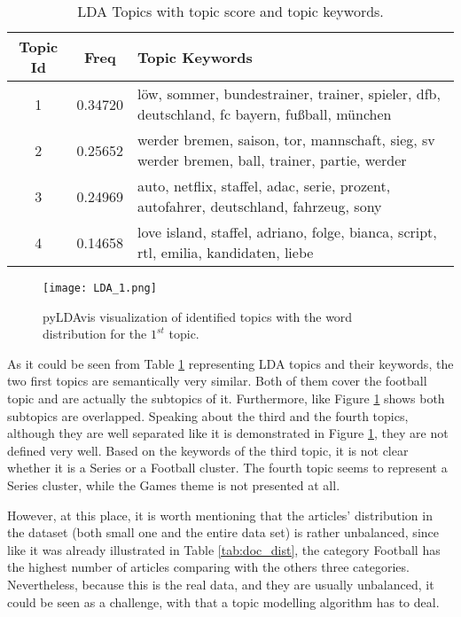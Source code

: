 \documentclass[fontsize=12pt,a4paper,twoside,openany]{scrbook}
\begin{document}
\renewcommand{\arraystretch}{2}
\begin{table}[ht]
    \centering
    \begin{tabularx}{\textwidth}{ |c|c|X| } 
        \hline
        \textbf{Topic Id} & \textbf{Freq} & \textbf{Topic Keywords} \\
        \hline
        1 & 0.34720 &  löw, sommer, bundestrainer, trainer, spieler, dfb, deutschland, fc bayern, fußball, münchen \\
        \hline
        2 & 0.25652 & werder bremen, saison, tor, mannschaft, sieg, sv werder bremen, ball, trainer, partie, werder \\
        \hline
        3 & 0.24969 & auto, netflix, staffel, adac, serie, prozent, autofahrer, deutschland, fahrzeug, sony \\
        \hline
        4 & 0.14658 &  love island, staffel, adriano, folge, bianca, script, rtl, emilia, kandidaten, liebe \\
        \hline
    \end{tabularx}
    \caption{LDA Topics with topic score and topic keywords.}
    \label{tab:lda_topic_keywords}
\end{table}
\renewcommand{\arraystretch}{1}

\begin{figure}[h]
\centering
\texttt{[image: LDA\_1.png]}
\caption{pyLDAvis visualization of identified topics with the word distribution for the \(1^{st}\) topic.}
\label{fig:lda_topics}
\end{figure}


As it could be seen from Table \ref{tab:lda_topic_keywords} representing LDA topics and their keywords, the two first topics are semantically very similar. Both of them cover the football topic and are actually the subtopics of it. Furthermore, like Figure \ref{fig:lda_topics} shows both subtopics are overlapped. Speaking about the third and the fourth topics, although they are well separated like it is demonstrated in Figure \ref{fig:lda_topics}, they are not defined very well. Based on the keywords of the third topic, it is not clear whether it is a Series or a Football cluster. The fourth topic seems to represent a Series cluster, while the Games theme is not presented at all.

However, at this place, it is worth mentioning that the articles' distribution in the dataset (both small one and the entire data set) is rather unbalanced, since like it was already illustrated in Table \ref{tab:doc_dist}, the category Football has the highest number of articles comparing with the others three categories. Nevertheless, because this is the real data, and they are usually unbalanced, it could be seen as a challenge, with that a topic modelling algorithm has to deal.
\end{document}
